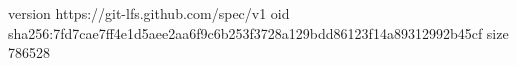version https://git-lfs.github.com/spec/v1
oid sha256:7fd7cae7ff4e1d5aee2aa6f9c6b253f3728a129bdd86123f14a89312992b45cf
size 786528
